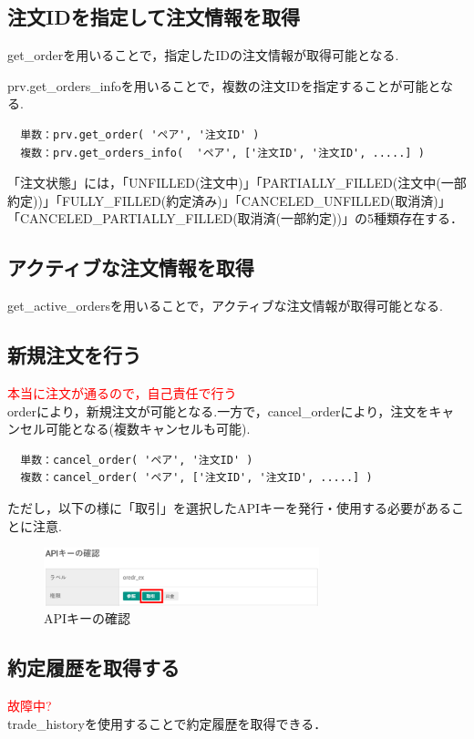 \subsection{注文IDを指定して注文情報を取得}
get\_orderを用いることで，指定したIDの注文情報が取得可能となる. 

prv.get\_orders\_infoを用いることで，複数の注文IDを指定することが可能となる.
\begin{verbatim}
  単数：prv.get_order( 'ペア', '注文ID' )
  複数：prv.get_orders_info(  'ペア', ['注文ID', '注文ID', .....] )
\end{verbatim}
「注文状態」には，「UNFILLED(注文中)」「PARTIALLY\_FILLED(注文中(一部約定))」「FULLY\_FILLED(約定済み)」「CANCELED\_UNFILLED(取消済)」「CANCELED\_PARTIALLY\_FILLED(取消済(一部約定))」の5種類存在する．
\newpage

\subsection{アクティブな注文情報を取得}
get\_active\_ordersを用いることで，アクティブな注文情報が取得可能となる.

\newpage

\subsection{新規注文を行う}
\textcolor{red}{本当に注文が通るので，自己責任で行う}\\
orderにより，新規注文が可能となる.一方で，cancel\_orderにより，注文をキャンセル可能となる(複数キャンセルも可能).

\begin{verbatim}
  単数：cancel_order( 'ペア', '注文ID' )
  複数：cancel_order( 'ペア', ['注文ID', '注文ID', .....] )
\end{verbatim}
ただし，以下の様に「取引」を選択したAPIキーを発行・使用する必要があることに注意.
\begin{figure}[H]
  \centering
  \includegraphics[width=8.0cm]{APIキーの確認.eps}
  \caption{APIキーの確認}
  \label{APIキーの確認}
\end{figure}
\newpage

\subsection{約定履歴を取得する}
\textcolor{red}{故障中?}\\
trade\_historyを使用することで約定履歴を取得できる．
